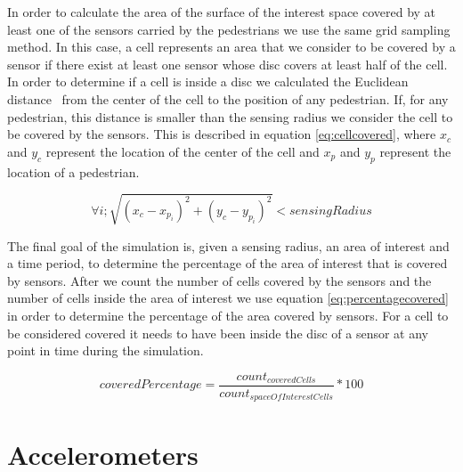 In order to calculate the area of the surface of the interest space covered by at least one of the sensors carried by the pedestrians we use the same grid sampling method. In this case, a cell represents an area that we consider to be covered by a sensor if there exist at least one sensor whose disc covers at least half of the cell. In order to determine if a cell is inside a disc we calculated the Euclidean distance~\cite{deza2009encyclopedia} from the center of the cell to the position of any pedestrian. If, for any pedestrian, this distance is smaller than the sensing radius we consider the cell to be covered by the sensors. This is described in equation \ref{eq:cellcovered}, where $x_c$ and $y_c$ represent the location of the center of the cell and $x_p$ and $y_p$ represent the location of a pedestrian.

\begin{equation}
\forall i; \sqrt{(x_{c}-x_{p_i})^2 + (y_{c}-y_{p_i})^2}<sensingRadius
\label{eq:cellcovered}
\end{equation}

The final goal of the simulation is, given a sensing radius, an area of interest and a time period, to determine the percentage of the area of interest that is covered by sensors. After we count the number of cells covered by the sensors and the number of cells inside the area of interest we use equation \ref{eq:percentagecovered} in order to determine the percentage of the area covered by sensors. For a cell to be considered covered it needs to have been inside the disc of a sensor at any point in time during the simulation.

\begin{equation}
coveredPercentage = \frac{count_{coveredCells}}{count_{spaceOfInterestCells}} *100
\label{eq:percentagecovered}
\end{equation}

\section{Accelerometers}
\label{sec:exp-acc}
